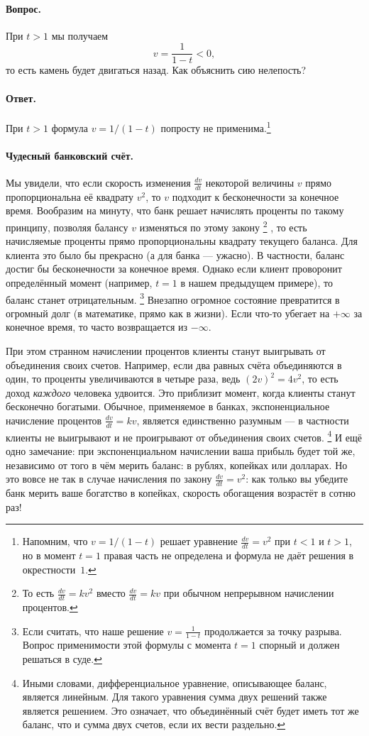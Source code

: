 \paragraph{Вопрос.}
При $t > 1$ мы получаем
\[
v=\frac{1}{1 - t} < 0,
\]
то есть камень будет двигаться назад.
Как объяснить сию нелепость?

\paragraph{Ответ.}
При $t > 1$ формула $v=1/(1 - t)$ попросту не применима.\footnote{Напомним, что $v=1/(1 - t)$ решает уравнение $\tfrac{dv}{dt}=v^2$ при $t<1$ и $t>1$, но в момент $t=1$ правая часть не определена и формула не даёт решения в окрестности~$1$.}

\paragraph{Чудесный банковский счёт.}
Мы увидели, что если скорость изменения $\tfrac{dv}{dt}$
некоторой величины $v$ прямо пропорциональна её квадрату $v^{2}$,
то $v$ подходит к бесконечности за конечное время.
Вообразим на минуту, что банк решает начислять проценты по такому принципу,
позволяя балансу $v$ изменяться по этому закону%
\footnote{То есть $\tfrac{dv}{dt}=kv^2$ вместо $\tfrac{dv}{dt}=kv$ при обычном непрерывном начислении процентов.}%
, то есть начисляемые проценты прямо пропорциональны квадрату текущего баланса.
Для клиента это было бы прекрасно (а для банка --- ужасно).
В частности, баланс достиг бы бесконечности за конечное время.
Однако если клиент проворонит определённый момент (например, $t=1$ в нашем предыдущем примере), то баланс станет отрицательным.%
\footnote{Если считать, что наше решение
$v=\frac{1}{1 - t}$ продолжается за точку разрыва. Вопрос применимости этой формулы с момента $t=1$ спорный и должен решаться в суде.}
Внезапно огромное состояние превратится в огромный долг (в математике, прямо как в жизни).
Если что-то убегает на $+\infty$ за конечное время, то часто возвращается из $-\infty$.

При этом странном начислении процентов клиенты станут выигрывать от объединения своих счетов.
Например, если два равных счёта объединяются в один,
то проценты увеличиваются в четыре раза, ведь
$(2v)^2=4v^2$,
то есть доход \emph{каждого} человека удвоится.
Это приблизит момент, когда клиенты станут бесконечно богатыми.
Обычное,
применяемое в банках, экспоненциальное начисление процентов
$\frac{dv}{dt}=kv$, является единственно разумным ---
в частности клиенты не выигрывают и не проигрывают
от объединения своих счетов.%
\footnote{Иными словами, дифференциальное уравнение, описывающее баланс, является линейным.
Для такого уравнения сумма двух решений также является решением.
Это означает, что объединённый счёт будет иметь тот же баланс, что и сумма двух счетов, если их вести раздельно.}
И ещё одно замечание: при экспоненциальном начислении ваша прибыль будет той же, независимо от того в чём мерить баланс: в рублях, копейках или долларах.
Но это вовсе не так в случае начисления по закону $\tfrac{dv}{dt}=v^2$:
как только вы убедите банк мерить ваше богатство в копейках, скорость обогащения возрастёт в сотню раз!

